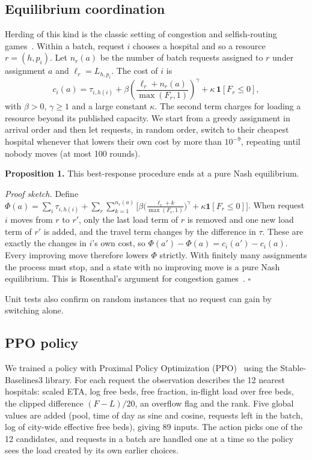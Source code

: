 \documentclass[conference]{IEEEtran}
\begin{document}
\subsection{Equilibrium coordination}
\label{sec:nash}
Herding of this kind is the classic setting of congestion and selfish-routing games~\cite{rosenthal1973class}. Within a batch, request $i$ chooses a hospital and so a resource $r=(h,p_i)$. Let $n_r(a)$ be the number of batch requests assigned to $r$ under assignment $a$ and $\ell_r=L_{h,p_i}$. The cost of $i$ is
\begin{equation}
c_i(a)=\tau_{i,h(i)}+\beta\left(\frac{\ell_r+n_r(a)}{\max(F_r,1)}\right)^{\gamma}+\kappa\,\mathbf{1}[F_r\le 0],
\label{eq:cost}
\end{equation}
with $\beta>0$, $\gamma\ge1$ and a large constant $\kappa$. The second term charges for loading a resource beyond its published capacity. We start from a greedy assignment in arrival order and then let requests, in random order, switch to their cheapest hospital whenever that lowers their own cost by more than $10^{-9}$, repeating until nobody moves (at most 100 rounds).

\textbf{Proposition 1.} This best-response procedure ends at a pure Nash equilibrium.

\emph{Proof sketch.} Define $\Phi(a)=\sum_i\tau_{i,h(i)}+\sum_r\sum_{k=1}^{n_r(a)}\big[\beta\big(\tfrac{\ell_r+k}{\max(F_r,1)}\big)^{\gamma}+\kappa\mathbf{1}[F_r\le0]\big]$. When request $i$ moves from $r$ to $r'$, only the last load term of $r$ is removed and one new load term of $r'$ is added, and the travel term changes by the difference in $\tau$. These are exactly the changes in $i$'s own cost, so $\Phi(a')-\Phi(a)=c_i(a')-c_i(a)$. Every improving move therefore lowers $\Phi$ strictly. With finitely many assignments the process must stop, and a state with no improving move is a pure Nash equilibrium. This is Rosenthal's argument for congestion games~\cite{rosenthal1973class}. \hfill$\square$

Unit tests also confirm on random instances that no request can gain by switching alone.

\subsection{PPO policy}
\label{sec:ppo}
We trained a policy with Proximal Policy Optimization (PPO)~\cite{schulman2017proximal} using the Stable-Baselines3 library. For each request the observation describes the 12 nearest hospitals: scaled ETA, log free beds, free fraction, in-flight load over free beds, the clipped difference $(F-L)/20$, an overflow flag and the rank. Five global values are added (pool, time of day as sine and cosine, requests left in the batch, log of city-wide effective free beds), giving 89 inputs. The action picks one of the 12 candidates, and requests in a batch are handled one at a time so the policy sees the load created by its own earlier choices.
\end{document}

